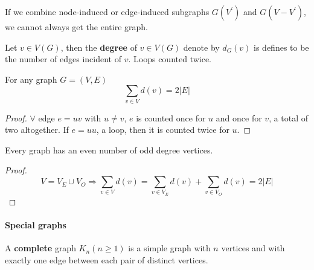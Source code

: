                     If we combine node-induced or edge-induced subgraphs $G(V^\prime )$ and $G(V - V^\prime )$, we cannot always get the entire graph.

                    \begin{definition}[Degree]
                        Let $v\in V(G)$, then the \textbf{degree} of $v\in V(G)$ denote by $d_G(v)$ is defines to be the number of edges incident of $v$. Loops counted twice.
                    \end{definition}

                    \begin{theorem}
                        For any graph $G=(V, E)$
                        \begin{equation*}
                            \sum_{v\in V}d(v) = 2|E|
                        \end{equation*}
                    \end{theorem}

                    \begin{proof}
                        $\forall$ edge $e=uv$ with $u \neq v$, $e$ is counted once for $u$ and once for $v$, a total of two altogether. If $e=uu$, a loop, then it is counted twice for $u$.
                    \end{proof}

                    \begin{corollary}
                        Every graph has an even number of odd degree vertices.
                    \end{corollary}

                    \begin{proof}
                        \begin{equation*}
                            V = V_E\cup V_O \Rightarrow 
                            \sum_{v\in V}d(v) = \sum_{v\in V_E} d(v) + \sum_{v\in V_O}d(v) = 2|E|
                        \end{equation*}
                    \end{proof}

                \paragraph{Special graphs}
                    \begin{definition}
                        A \textbf{complete} graph $K_n (n \ge 1)$ is a simple graph with $n$ vertices and with exactly one edge between each pair of distinct vertices.
                    \end{definition}


